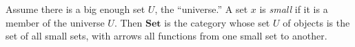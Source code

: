 Assume there is a big enough set $U$, the ``universe.'' A set $x$ is \emph{small} if it is a member of the universe $U$. Then $\mathbf{Set}$ is the category whose set $U$ of objects is the set of all small sets, with arrows all functions from one small set to another.
